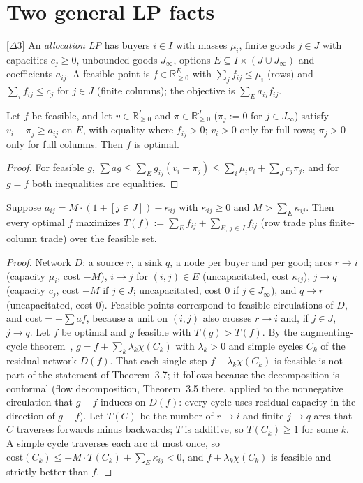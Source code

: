 \section{Two general LP facts}\label{sec:sh-lp}

[$\Delta3$] An \emph{allocation LP} has buyers $i\in I$ with masses $\mu_i$, finite goods $j\in J$ with
capacities $c_j\ge0$, unbounded goods $J_\infty$, options $E\subseteq I\times(J\cup J_\infty)$ and
coefficients $a_{ij}$. A feasible point is $f\in\mathbb{R}^E_{\ge0}$ with $\sum_jf_{ij}\le\mu_i$ (rows)
and $\sum_if_{ij}\le c_j$ for $j\in J$ (finite columns); the objective is $\sum_Ea_{ij}f_{ij}$.

\begin{lemma}\label{lem:sh-cs}
\statuslean
Let $f$ be feasible, and let $v\in\mathbb{R}^I_{\ge0}$ and $\pi\in\mathbb{R}^J_{\ge0}$ ($\pi_j:=0$ for
$j\in J_\infty$) satisfy $v_i+\pi_j\ge a_{ij}$ on $E$, with equality where $f_{ij}>0$; $v_i>0$ only for
full rows; $\pi_j>0$ only for full columns. Then $f$ is optimal.
\end{lemma}

\begin{proof}
For feasible $g$, $\sum a g\le\sum_Eg_{ij}(v_i+\pi_j)\le\sum_i\mu_iv_i+\sum_Jc_j\pi_j$, and for $g=f$
both inequalities are equalities.
\end{proof}

\begin{lemma}[Big $M$]\label{lem:sh-bigM}
\statuslean
Suppose $a_{ij}=M\cdot(1+[j\in J])-\kappa_{ij}$ with $\kappa_{ij}\ge0$ and $M>\sum_E\kappa_{ij}$. Then
every optimal $f$ maximizes $T(f):=\sum_Ef_{ij}+\sum_{E,\,j\in J}f_{ij}$ (row trade plus finite-column
trade) over the feasible set.
\end{lemma}

\begin{proof}
Network $D$: a source $r$, a sink $q$, a node per buyer and per good; arcs $r\to i$ (capacity $\mu_i$,
cost $-M$), $i\to j$ for $(i,j)\in E$ (uncapacitated, cost $\kappa_{ij}$), $j\to q$ (capacity $c_j$,
cost $-M$ if $j\in J$; uncapacitated, cost $0$ if $j\in J_\infty$), and $q\to r$ (uncapacitated, cost
$0$). Feasible points correspond to feasible circulations of $D$, and cost${}=-\sum af$, because a unit
on $(i,j)$ also crosses $r\to i$ and, if $j\in J$, $j\to q$. Let $f$ be optimal and $g$ feasible with
$T(g)>T(f)$. By the augmenting-cycle theorem~\cite{amo93}, $g=f+\sum_k\lambda_k\chi(C_k)$ with $\lambda_k>0$ and simple cycles $C_k$ of the
residual network $D(f)$. That each single step $f+\lambda_k\chi(C_k)$ is feasible is not part of the
statement of Theorem~3.7; it follows because the decomposition is conformal (flow decomposition,
Theorem~3.5 there, applied to the nonnegative circulation that $g-f$ induces on $D(f)$: every cycle uses
residual capacity in the direction of $g-f$). Let $T(C)$ be the number of $r\to i$ and finite $j\to q$
arcs that $C$ traverses forwards minus backwards; $T$ is additive, so $T(C_k)\ge1$ for some $k$. A
simple cycle traverses each arc at most once, so $\mathrm{cost}(C_k)\le-M\cdot
T(C_k)+\sum_E\kappa_{ij}<0$, and $f+\lambda_k\chi(C_k)$ is feasible and strictly better than $f$.
\end{proof}

